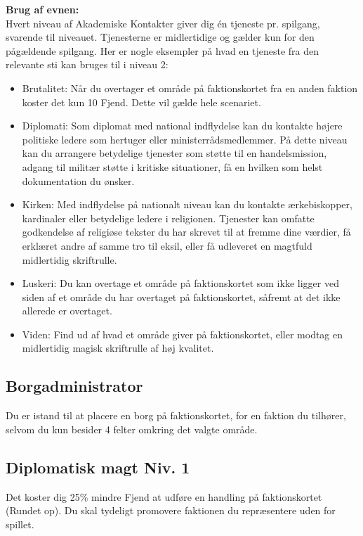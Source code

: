 \textbf{Brug af evnen:}\\
Hvert niveau af Akademiske Kontakter giver dig én tjeneste pr. spilgang, svarende til niveauet. Tjenesterne er midlertidige og gælder kun for den pågældende spilgang. Her er nogle eksempler på hvad en tjeneste fra den relevante sti kan bruges til i niveau 2:\\
\begin{itemize}
    \item Brutalitet: Når du overtager et område på faktionskortet fra en anden faktion koster det kun 10 Fjend. Dette vil gælde hele scenariet. 
    \item Diplomati: Som diplomat med national indflydelse kan du kontakte højere politiske ledere som hertuger eller ministerrådsmedlemmer. På dette niveau kan du arrangere betydelige tjenester som støtte til en handelsmission, adgang til militær støtte i kritiske situationer, få en hvilken som helst dokumentation du ønsker.
    \item Kirken: Med indflydelse på nationalt niveau kan du kontakte ærkebiskopper, kardinaler eller betydelige ledere i religionen. Tjenester kan omfatte godkendelse af religiøse tekster du har skrevet til at fremme dine værdier, få erklæret andre af samme tro til eksil, eller få udleveret en magtfuld midlertidig skriftrulle.
    \item Luskeri: Du kan overtage et område på faktionskortet som ikke ligger ved siden af et område du har overtaget på faktionskortet, såfremt at det ikke allerede er overtaget. 
    \item Viden: Find ud af hvad et område giver på faktionskortet, eller modtag en midlertidig magisk skriftrulle af høj kvalitet.
\end{itemize}


\subsection*{Borgadministrator}
Du er istand til at placere en borg på faktionskortet, for en faktion du tilhører, selvom du kun besider 4 felter omkring det valgte område.


\subsection*{Diplomatisk magt Niv. 1}
Det koster dig 25\% mindre Fjend at udføre en handling på faktionskortet (Rundet op). Du skal tydeligt promovere faktionen du repræsentere uden for spillet.

